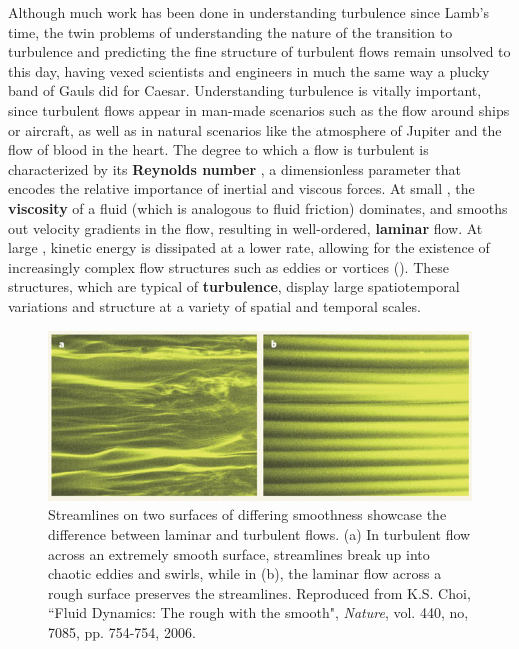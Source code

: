 Although much work has been done in understanding turbulence since Lamb's time, the twin problems of understanding the nature of the transition to turbulence and predicting the fine structure of turbulent flows remain unsolved to this day, having vexed scientists and engineers in much the same way a plucky band of Gauls did for Caesar. Understanding turbulence is vitally important, since turbulent flows appear in man-made scenarios such as the flow around ships or aircraft, as well as in natural scenarios like the atmosphere of Jupiter and the flow of blood in the heart. The degree to which a flow is turbulent is characterized by its {\bf Reynolds number} \ReN, a dimensionless parameter that encodes the relative importance of inertial and viscous forces. At small \ReN, the {\bf viscosity} of a fluid (which is analogous to fluid friction) dominates, and smooths out velocity gradients in the flow, resulting in well-ordered, {\bf laminar} flow. At large \ReN, kinetic energy is dissipated at a lower rate, allowing for the existence of increasingly complex flow structures such as eddies or vortices (). These structures, which are typical of {\bf turbulence}, display large spatiotemporal variations and structure at a variety of spatial and temporal scales.
\begin{figure}[h]
\centerline{
\includegraphics[width=\textwidth]{Figs/laminarTurbulent}}
\caption{Streamlines on two surfaces of differing smoothness showcase the difference between laminar and turbulent flows. (a) In turbulent flow across an extremely smooth surface, streamlines break up into chaotic eddies and swirls, while in (b), the laminar flow across a rough surface preserves the streamlines. Reproduced from K.S. Choi, ``Fluid Dynamics: The rough with the smooth", \emph{Nature},  vol. 440, no, 7085, pp. 754-754, 2006.}\label{fig:cylinderWake}
\end{figure}
